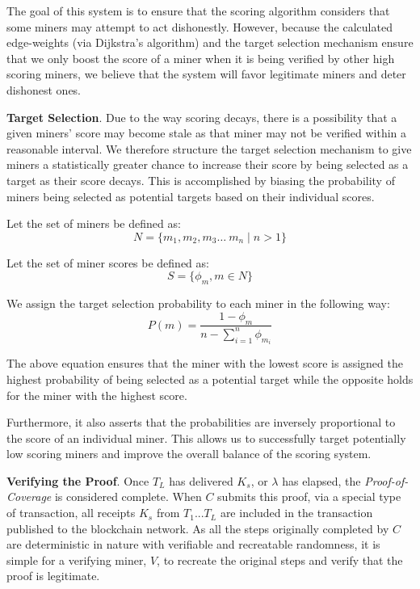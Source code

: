 \documentclass[10pt, nonatbib, nocopyrightspace, reprint]{sigplanconf}
\begin{document}
The goal of this system is to ensure that the scoring algorithm considers that some miners may attempt to act dishonestly. However, because the calculated edge-weights (via Dijkstra's algorithm) and the target selection mechanism ensure that we only boost the score of a miner when it is being verified by other high scoring miners, we believe that the system will favor legitimate miners and deter dishonest ones.

\textbf{Target Selection}. Due to the way scoring decays, there is a possibility that a given miners' score may become stale as that miner may not be verified within a reasonable interval. We therefore structure the target selection mechanism to give miners a statistically greater chance to increase their score by being selected as a target as their score decays. This is accomplished by biasing the probability of miners being selected as potential targets based on their individual scores.

Let the set of miners be defined as:
\begin{equation*} \label{set-of-miners}
        N = \{m_1, m_2, m_3 \dots\ m_n \mid n > 1\}
\end{equation*}

Let the set of miner scores be defined as:
\begin{equation*} \label{set-of-scores}
        S = \{\phi_m, m \in N\}
\end{equation*}

We assign the target selection probability to each miner in the following way:
\begin{equation*} \label{target-selection-probability}
        P(m) = \frac{1-\phi_m}{n - \displaystyle\sum_{i=1}^{n} {\phi_{m_i}}}
\end{equation*}

The above equation ensures that the miner with the lowest score is assigned the highest probability of being selected as a potential target while the opposite holds for the miner with the highest score.

Furthermore, it also asserts that the probabilities are inversely proportional to the score of an individual miner. This allows us to successfully target potentially low scoring miners and improve the overall balance of the scoring system.

\textbf{Verifying the Proof}. Once $T_L$ has delivered $K_s$, or $\lambda$ has elapsed, the \emph{Proof-of-Coverage} is considered complete. When $C$ submits this proof, via a special type of transaction, all receipts $K_s$ from $T_1$...$T_L$ are included in the transaction published to the blockchain network. As all the steps originally completed by $C$ are deterministic in nature with verifiable and recreatable randomness, it is simple for a verifying miner, $V$, to recreate the original steps and verify that the proof is legitimate.
\end{document}
